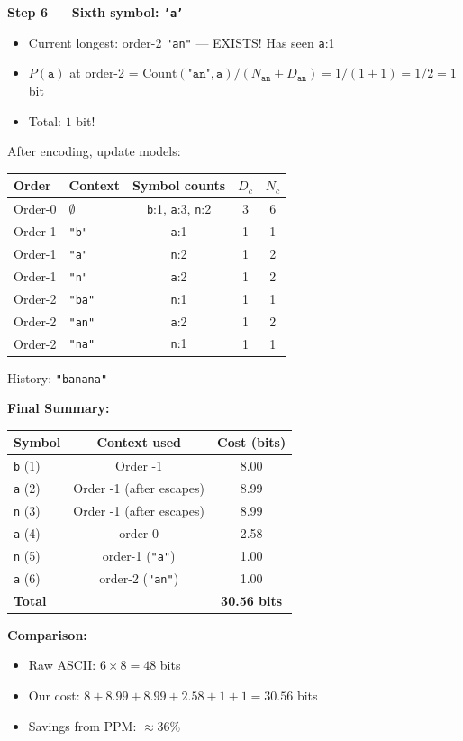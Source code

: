 \begin{examplebox}
\bigskip
\textbf{Step 6 — Sixth symbol: \texttt{'a'}}
\begin{itemize}
    \item Current longest: order-2 \texttt{"an"} — EXISTS! Has seen \texttt{a}:1
    \item $P(\texttt{a})$ at order-2 = $\text{Count}(\texttt{"an"},\texttt{a})/(N_{\texttt{an}}+D_{\texttt{an}}) = 1/(1+1) = 1/2 = 1$ bit
    \item Total: $1$ bit!
\end{itemize}
After encoding, update models:

\begin{center}
\footnotesize
\begin{tabular}{|l|l|c|c|c|}
\hline
\textbf{Order} & \textbf{Context} & \textbf{Symbol counts} & $D_c$ & $N_c$ \\
\hline
Order-0 & $\emptyset$ & \texttt{b}:1, \texttt{a}:3, \texttt{n}:2 & 3 & 6 \\
Order-1 & \texttt{"b"} & \texttt{a}:1 & 1 & 1 \\
Order-1 & \texttt{"a"} & \texttt{n}:2 & 1 & 2 \\
Order-1 & \texttt{"n"} & \texttt{a}:2 & 1 & 2 \\
Order-2 & \texttt{"ba"} & \texttt{n}:1 & 1 & 1 \\
Order-2 & \texttt{"an"} & \texttt{a}:2 & 1 & 2 \\
Order-2 & \texttt{"na"} & \texttt{n}:1 & 1 & 1 \\
\hline
\end{tabular}
\end{center}
History: \texttt{"banana"}

\bigskip
\textbf{Final Summary:}
\begin{center}
\begin{tabular}{l|c|c}
\textbf{Symbol} & \textbf{Context used} & \textbf{Cost (bits)} \\
\hline
\texttt{b} (1) & Order -1 & 8.00 \\
\texttt{a} (2) & Order -1 (after escapes) & 8.99 \\
\texttt{n} (3) & Order -1 (after escapes) & 8.99 \\
\texttt{a} (4) & order-0 & 2.58 \\
\texttt{n} (5) & order-1 (\texttt{"a"}) & 1.00 \\
\texttt{a} (6) & order-2 (\texttt{"an"}) & 1.00 \\
\hline
\textbf{Total} & & \textbf{30.56 bits} \\
\end{tabular}
\end{center}

\textbf{Comparison:}
\begin{itemize}
    \item Raw ASCII: $6 \times 8 = 48$ bits
    \item Our cost: $8 + 8.99 + 8.99 + 2.58 + 1 + 1 = 30.56$ bits
    \item Savings from PPM: $\approx 36\%$
\end{itemize}
\end{examplebox}


